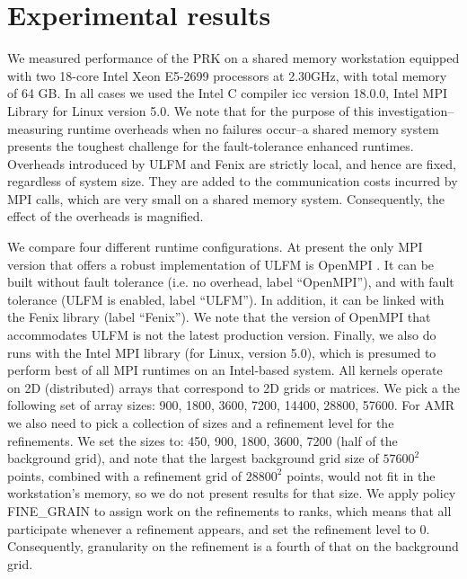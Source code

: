 \section{Experimental results}\label{sec:results}
We measured performance of the PRK on a shared memory workstation
equipped with two 18-core
Intel\regtm{} Xeon\regtm{} E5-2699 processors at 2.30GHz,
with total memory of 64 GB.
In all cases we used the Intel\regtm{} C compiler icc
version 18.0.0, Intel\regtm{} MPI Library for Linux version 5.0.
We note that for the purpose of this investigation--measuring runtime
overheads when no failures occur--a shared memory system
presents the toughest challenge for the fault-tolerance enhanced runtimes.
Overheads introduced by ULFM and Fenix are strictly local, and hence
are fixed, regardless of system size.
They are added to the communication costs incurred by MPI calls, which are
very small on a shared memory system.
Consequently, the effect of the overheads is magnified.

We compare four different runtime configurations.
At present the only MPI version that offers a robust implementation of ULFM
is OpenMPI \cite{openmpi}.
It can be built without fault tolerance (i.e. no overhead, label ``OpenMPI''), and with
fault tolerance (ULFM is enabled, label ``ULFM'').
In addition, it can be linked with the Fenix library (label ``Fenix'').
We note that the version of OpenMPI that accommodates ULFM is not the latest production
version.
Finally, we also do runs with the Intel\regtm{} MPI library (for Linux, version 5.0),
which is presumed to perform best of all MPI runtimes on an Intel-based system.
All kernels operate on 2D (distributed) arrays that correspond to 2D grids or matrices.
We pick a the following set of array sizes: 900, 1800, 3600, 7200, 14400, 28800,
57600.
For AMR we also need to pick a collection of sizes and a refinement level for the refinements.
We set the sizes to: 450, 900, 1800, 3600, 7200 (half of the background grid), and note that the largest background
grid size of $57600^2$ points, combined with a refinement grid of $28800^2$
points, would not fit in the workstation's memory, so we do not present results
for that size.
We apply policy FINE\_GRAIN to assign work on the refinements to ranks, which
means that all participate whenever a refinement appears, and set the refinement level to 0.
Consequently, granularity on the refinement is a fourth of that on the background grid.

